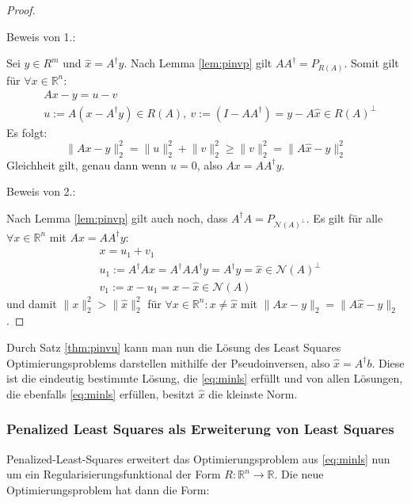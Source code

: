 \documentclass{article}
\newcommand{\R}[0]{\mathbb{R}}
\theoremstyle{plain}
\theoremstyle{definition}
\begin{document}
\begin{proof}\cite[S. 256, Satz 4.8.5.4]{stoer2005numerisch}
    
    Beweis von 1.:
    
    Sei $y \in R^m$ und $\hat{x} = A^{\dagger}y$. Nach Lemma \ref{lem:pinvp} gilt $AA^{\dagger} = P_{R(A)}$. Somit gilt für $\forall x \in \R^n$:
    \begin{align}
        &Ax - y = u - v \\
        &u := A(x - A^{\dagger}y) \in R(A), \: v:=(I-AA^{\dagger}) = y - A\hat{x} \in R(A)^{\bot}
    \end{align}
    Es folgt:
    \begin{equation}
        \lVert Ax - y \rVert^2_2 = \lVert u \rVert^2_2 + \lVert v \rVert^2_2 \geq \lVert v \rVert^2_2 = \lVert A\hat{x} - y\rVert^2_2
    \end{equation}
    Gleichheit gilt, genau dann wenn $u = 0$, also $Ax = AA^{\dagger}y$.

    Beweis von 2.:

    Nach Lemma \ref{lem:pinvp} gilt auch noch, dass $A^{\dagger}A = P_{\mathcal{N}(A)^{\bot}}$. Es gilt für alle $\forall x \in \R^n$ 
    mit $Ax = AA^{\dagger}y$:
    \begin{align}
        &x = u_1 + v_1 \\
        &u_1 := A^{\dagger}A x = A^{\dagger}AA^{\dagger}y = A^{\dagger}y = \hat{x} \in \mathcal{N}(A)^{\bot} \\
        &v_1 := x - u_1 = x - \hat{x} \in \mathcal{N}(A)
    \end{align}
    und damit $\lVert x \rVert^2_2 > \lVert \hat{x} \rVert^2_2$ für $\forall x \in \R^n: x \neq \hat{x}$ mit $\lVert Ax - y \rVert_2 = \lVert A\hat{x} - y\rVert_2$.


\end{proof}

Durch Satz \ref{thm:pinvu} kann man nun die Lösung des Least Squares Optimierungsproblems darstellen mithilfe der Pseudoinversen, also $\hat{x} = A^{\dagger} b$.
Diese ist die eindeutig bestimmte Lösung, die \ref{eq:minls} erfüllt und von allen Lösungen, die ebenfalls \ref{eq:minls} erfüllen, besitzt $\hat{x}$ die kleinste Norm.

\subsubsection{Penalized Least Squares als Erweiterung von Least Squares}
Penalized-Least-Squares erweitert das Optimierungsproblem aus \ref{eq:minls} nun um ein Regularisierungsfunktional der Form $R: \R^n \to \R$.
Die neue Optimierungsproblem hat dann die Form:
\end{document}
